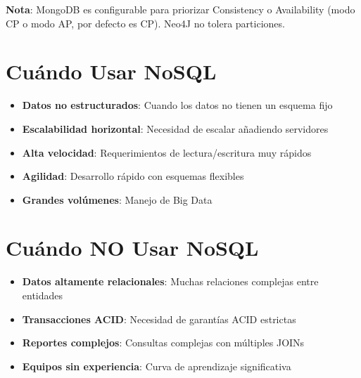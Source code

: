 \documentclass[12pt]{article}
\begin{document}
\textbf{Nota}: MongoDB es configurable para priorizar Consistency o Availability (modo CP o modo AP, por defecto es CP). Neo4J no tolera particiones.


\section{Cuándo Usar NoSQL}
\begin{itemize}
    \item \textbf{Datos no estructurados}: Cuando los datos no tienen un esquema fijo
    \item \textbf{Escalabilidad horizontal}: Necesidad de escalar añadiendo servidores
    \item \textbf{Alta velocidad}: Requerimientos de lectura/escritura muy rápidos
    \item \textbf{Agilidad}: Desarrollo rápido con esquemas flexibles
    \item \textbf{Grandes volúmenes}: Manejo de Big Data
\end{itemize}

\section{Cuándo NO Usar NoSQL}
\begin{itemize}
    \item \textbf{Datos altamente relacionales}: Muchas relaciones complejas entre entidades
    \item \textbf{Transacciones ACID}: Necesidad de garantías ACID estrictas
    \item \textbf{Reportes complejos}: Consultas complejas con múltiples JOINs
    \item \textbf{Equipos sin experiencia}: Curva de aprendizaje significativa
\end{itemize}
\end{document}
